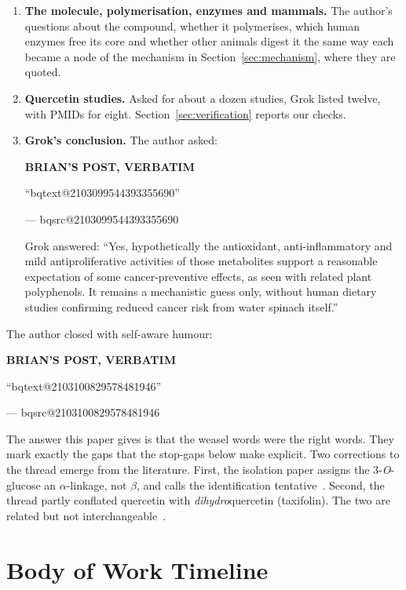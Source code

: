 \documentclass[11pt,a4paper]{article}
\makeatletter
\newcommand{\BQ}[1]{\begin{tcolorbox}[bqstyle]%
{\sffamily\bfseries\footnotesize\color{teal!80!black}BRIAN'S POST, VERBATIM}\par\smallskip
``\csname bqtext@#1\endcsname''\par\smallskip
{\raggedleft\footnotesize --- \csname bqsrc@#1\endcsname\par}\end{tcolorbox}}
\makeatother
\begin{document}
\begin{enumerate}[label=\textbf{\arabic*.}]
\noindent Grok replied that lab extracts act at tens to hundreds of $\mu$g/mL, that dietary intake yields far lower systemic levels, and that there is ``no human evidence that regular intake produces meaningful persistent apoptosis beyond general vegetable benefits.''

\item \textbf{The molecule, polymerisation, enzymes and mammals.} The author's questions about the compound, whether it polymerises, which human enzymes free its core and whether other animals digest it the same way each became a node of the mechanism in Section~\ref{sec:mechanism}, where they are quoted.

\item \textbf{Quercetin studies.} Asked for about a dozen studies, Grok listed twelve, with PMIDs for eight. Section~\ref{sec:verification} reports our checks.

\item \textbf{Grok's conclusion.} The author asked:

\BQ{2103099544393355690}

\noindent Grok answered: ``Yes, hypothetically the antioxidant, anti-inflammatory and mild antiproliferative activities of those metabolites support a reasonable expectation of some cancer-preventive effects, as seen with related plant polyphenols. It remains a mechanistic guess only, without human dietary studies confirming reduced cancer risk from water spinach itself.''
\end{enumerate}

\noindent The author closed with self-aware humour:

\BQ{2103100829578481946}

\noindent The answer this paper gives is that the weasel words were the right words. They mark exactly the gaps that the stop-gaps below make explicit. Two corrections to the thread emerge from the literature. First, the isolation paper assigns the 3-\emph{O}-glucose an $\alpha$-linkage, not $\beta$, and calls the identification tentative~\cite{prasad2005}. Second, the thread partly conflated quercetin with \emph{dihydro}quercetin (taxifolin). The two are related but not interchangeable~\cite{luo2008,bjeldanes1977}.

\section{Body of Work Timeline}
\label{sec:timeline}
\end{document}
